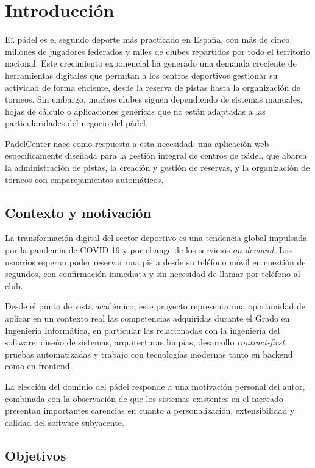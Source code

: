 \chapter{Introducción}
\label{chap:introducion}

\lettrine{E}{l} pádel es el segundo deporte más practicado en España, con más de
cinco millones de jugadores federados y miles de clubes repartidos por todo el
territorio nacional. Este crecimiento exponencial ha generado una demanda
creciente de herramientas digitales que permitan a los centros deportivos gestionar
su actividad de forma eficiente, desde la reserva de pistas hasta la organización
de torneos. Sin embargo, muchos clubes siguen dependiendo de sistemas manuales,
hojas de cálculo o aplicaciones genéricas que no están adaptadas a las
particularidades del negocio del pádel.

PadelCenter nace como respuesta a esta necesidad: una aplicación web específicamente
diseñada para la gestión integral de centros de pádel, que abarca la administración
de pistas, la creación y gestión de reservas, y la organización de torneos con
emparejamientos automáticos.

\section{Contexto y motivación}
\label{sec:contexto}

La transformación digital del sector deportivo es una tendencia global impulsada
por la pandemia de COVID-19 y por el auge de los servicios \textit{on-demand}.
Los usuarios esperan poder reservar una pista desde su teléfono móvil en cuestión
de segundos, con confirmación inmediata y sin necesidad de llamar por teléfono
al club.

Desde el punto de vista académico, este proyecto representa una oportunidad de
aplicar en un contexto real las competencias adquiridas durante el Grado en
Ingeniería Informática, en particular las relacionadas con la ingeniería del
software: diseño de sistemas, arquitecturas limpias, desarrollo \textit{contract-first},
pruebas automatizadas y trabajo con tecnologías modernas tanto en backend como
en frontend.

La elección del dominio del pádel responde a una motivación personal del autor,
combinada con la observación de que los sistemas existentes en el mercado presentan
importantes carencias en cuanto a personalización, extensibilidad y calidad del
software subyacente.

\section{Objetivos}
\label{sec:objetivos}

